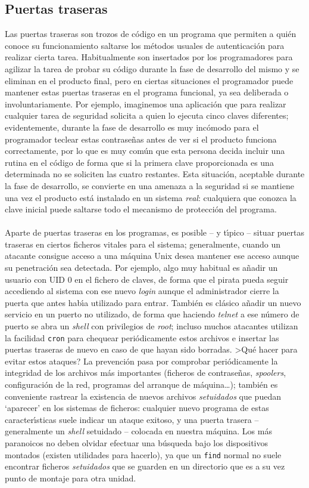 \subsection{Puertas traseras}
Las puertas traseras son trozos de c\'odigo en un programa que permiten a 
qui\'en conoce su funcionamiento saltarse los m\'etodos usuales de 
autenticaci\'on para realizar cierta tarea. Habitualmente son insertados por
los programadores para agilizar la tarea de probar su c\'odigo durante la
fase de desarrollo del mismo y se eliminan en el producto final, pero en 
ciertas situaciones el programador puede mantener estas puertas traseras en el
programa funcional, ya sea deliberada o involuntariamente. Por ejemplo, 
imaginemos una aplicaci\'on que para realizar cualquier tarea de seguridad 
solicita a quien lo ejecuta cinco claves diferentes; evidentemente, durante 
la fase de desarrollo es muy inc\'omodo para el programador teclear estas 
contrase\~nas antes de ver si el producto funciona correctamente, por lo que
es muy com\'un que esta persona decida incluir una rutina en el c\'odigo de
forma que si la primera clave proporcionada es una determinada no se soliciten
las cuatro restantes. Esta situaci\'on, aceptable durante la fase de desarrollo,
se convierte en una amenaza a la seguridad si se mantiene una vez el producto
est\'a instalado en un sistema {\it real}: cualquiera que conozca la clave
inicial puede saltarse todo el mecanismo de protecci\'on del programa.\\
\\Aparte de puertas traseras en los programas, es posible -- y t\'{\i}pico -- 
situar puertas traseras en ciertos ficheros vitales para el sistema; 
generalmente, cuando un atacante consigue acceso a una m\'aquina Unix desea 
mantener ese acceso aunque su penetraci\'on sea detectada. Por ejemplo, algo 
muy habitual es a\~nadir un usuario con UID 0 en el fichero de claves, de forma
que el pirata pueda seguir accediendo al sistema con ese nuevo {\it login}
aunque el administrador cierre la puerta que antes hab\'{\i}a utilizado para 
entrar. Tambi\'en es cl\'asico a\~nadir un nuevo servicio en un puerto no 
utilizado, de forma que haciendo {\it telnet} a ese n\'umero de puerto se
abra un {\it shell} con privilegios de {\it root}; incluso muchos atacantes
utilizan la facilidad {\tt cron} para chequear peri\'odicamente estos archivos
e insertar las puertas traseras de nuevo en caso de que hayan sido borradas.
>Qu\'e hacer para evitar estos ataques? La prevenci\'on pasa por comprobar
peri\'odicamente la integridad de los archivos m\'as importantes (ficheros de
contrase\~nas, {\it spoolers}, configuraci\'on de la red, programas del arranque
de m\'aquina\ldots); tambi\'en es conveniente rastrear la existencia de nuevos
archivos {\it setuidados} que puedan `aparecer' en los sistemas de ficheros:
cualquier nuevo programa de estas caracter\'{\i}sticas suele indicar un ataque
exitoso, y una puerta trasera -- generalmente un {\it shell} setuidado -- 
colocada en nuestra m\'aquina. Los m\'as paranoicos no deben olvidar efectuar
una b\'usqueda bajo los dispositivos montados (existen utilidades para hacerlo),
ya que un {\tt find} normal no suele encontrar ficheros {\it setuidados} que se 
guarden en un directorio que es a su vez punto de montaje para otra unidad.
